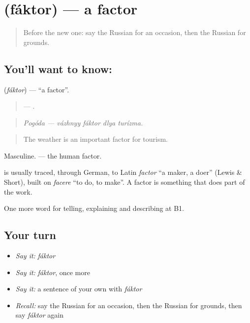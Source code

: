 \section[\texorpdfstring{\ru{фактор} (fáktor)}{фактор (fáktor)}]{ (fáktor) — a factor}

\label{lesson:RU-C348-faktor}



\begin{quote}
Before the new one: say the Russian for an occasion, then the Russian for grounds.
\end{quote}

\subsection*{You'll want to know: }
\textbf{} (\emph{fáktor}) — \textquotedblleft{}a factor\textquotedblright{}.

\begin{quote}
 —    .
\end{quote}

\begin{quote}
\emph{Pogóda — vázhnyy fáktor dlya turízma.}
\end{quote}

\begin{quote}
The weather is an important factor for tourism.
\end{quote}

Masculine. \emph{ } — the human factor.

\begin{cousinweb}
\textbf{} is usually traced, through German, to Latin \emph{factor} \textquotedblleft{}a maker, a doer\textquotedblright{} (Lewis \& Short), built on \emph{facere} \textquotedblleft{}to do, to make\textquotedblright{}. A factor is something that does part of the work.
\end{cousinweb}

\begin{grammarlens}[title={What you've built}]
One more word for telling, explaining and describing at B1.
\end{grammarlens}

\subsection*{Your turn}
\begin{itemize}
\raggedright
  \item \emph{Say it:} \emph{fáktor}
  \item \emph{Say it:} \emph{fáktor}, once more
  \item \emph{Say it:} a sentence of your own with \emph{fáktor}
  \item \emph{Recall:} say the Russian for an occasion, then the Russian for grounds, then say \emph{fáktor} again
\end{itemize}

